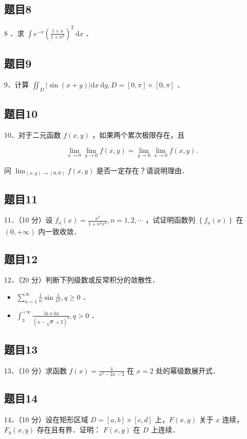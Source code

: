 \documentclass{article}
\begin{document}
\subsection{题目8}
8 ．求 \(\int e^{-x}\left(\frac{1+x}{1+x^{2}}\right)^{2} \mathrm{~d} x\) ．

\subsection{题目9}
9．计算 \(\iint_{D}|\sin (x+y)| \mathrm{d} x \mathrm{~d} y, D=[0, \pi] \times[0, \pi]\) ．

\subsection{题目10}
10．对于二元函数 \(f(x, y)\) ，如果两个累次极限存在，且

\[
\lim _{x \rightarrow 0} \lim _{y \rightarrow 0} f(x, y)=\lim _{y \rightarrow 0} \lim _{x \rightarrow 0} f(x, y) .
\]

问 \(\lim _{(x, y) \rightarrow(0,0)} f(x, y)\) 是否一定存在？请说明理由．

\subsection{题目11}
11．（10 分）设 \(f_{n}(x)=\frac{x^{2}}{1+n^{3} x^{3}}, n=1,2, \cdots\) ，试证明函数列 \(\left\{f_{n}(x)\right\}\) 在 \((0,+\infty)\) 内一致收敛．

\subsection{题目12}
12．（20 分）判断下列级数或反常积分的敛散性．

\begin{itemize}
  \item[（1）] \(\sum_{n=1}^{\infty} \frac{1}{n} \sin \frac{1}{n^{q}}, q \geq 0\) ．
  \item[（2）] \(\int_{3}^{+\infty} \frac{\ln x \mathrm{~d} x}{(x-\sqrt{x}+2)^{q}}, q>0\) ．
\end{itemize}

\subsection{题目13}
13．（10 分）求函数 \(f(x)=\frac{4}{x^{2}-2 x-3}\) 在 \(x=2\) 处的幂级数展开式．

\subsection{题目14}
14．（10 分）设在矩形区域 \(D=[a, b] \times[c, d]\) 上，\(F(x, y)\) 关于 \(x\) 连续，\(F_{y}(x, y)\) 存在且有界．证明： \(F(x, y)\) 在 \(D\) 上连续．
\end{document}
